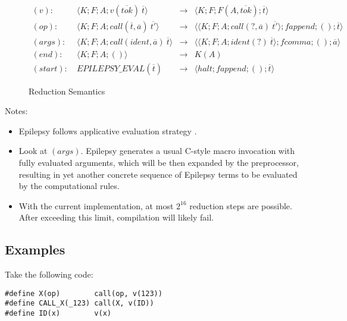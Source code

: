 \documentclass[12pt]{article}
\theoremstyle{break}
\begin{document}
\begin{figure}
    \caption{Reduction Semantics}

    \begin{align*}
        (v): \ & \langle K; F; A; v(\overline{tok}) \ \overline{t} \rangle & \to &
            \langle K; F; F(A, \overline{tok}); \overline{t} \rangle \\
        (op): \ & \langle K; F; A; call(\overline{t}, \overline{a}) \ \overline{t'} \rangle & \to &
            \langle \langle K; F; A; call(?, \overline{a}) \ \overline{t'} \rangle; fappend; (); \overline{t} \rangle \\
        (args): \ & \langle K; F; A; call(ident, \overline{a}) \ \overline{t} \rangle & \to
            & \langle \langle K; F; A; ident(?) \ \overline{t} \rangle; fcomma; (); \overline{a} \rangle \\
        (end): \ & \langle K; F; A; () \rangle & \to & K(A) \\
        (start): \ & EPILEPSY\_EVAL(\overline{t}) & \to &
            \langle halt; fappend; (); \overline{t} \rangle
    \end{align*}
    \label{ReductionSemantics}
\end{figure}

Notes:

\begin{itemize}
    \item Epilepsy follows applicative evaluation strategy \cite{ApplicativeEvaluationStrategy}.

    \item Look at $(args)$. Epilepsy generates a usual C-style macro invocation with
    fully evaluated arguments, which will be then expanded by the preprocessor, resulting
    in yet another concrete sequence of Epilepsy terms to be evaluated by the computational
    rules.
    \item With the current implementation, at most $2^{16}$ reduction steps are
    possible. After exceeding this limit, compilation will likely fail.
\end{itemize}

\subsection{Examples}

Take the following code:

\begin{verbatim}
#define X(op)        call(op, v(123))
#define CALL_X(_123) call(X, v(ID))
#define ID(x)        v(x)
\end{verbatim}
\end{document}

